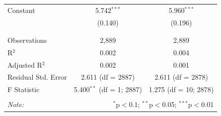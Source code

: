 \documentclass[
  man,floatsintext]{apa7}
\begin{document}
\begin{table}[!htbp]
\begin{tabular}{@{\extracolsep{1pt}}lcc}
 Constant & 5.742$^{***}$ & 5.960$^{***}$ \\ 
  & (0.140) & (0.196) \\ 
  & & \\ 
\hline \\[-1.8ex] 
Observations & 2,889 & 2,889 \\ 
R$^{2}$ & 0.002 & 0.004 \\ 
Adjusted R$^{2}$ & 0.002 & 0.001 \\ 
Residual Std. Error & 2.611 (df = 2887) & 2.611 (df = 2878) \\ 
F Statistic & 5.400$^{**}$ (df = 1; 2887) & 1.275 (df = 10; 2878) \\ 
\hline 
\hline \\[-1.8ex] 
\textit{Note:}  & \multicolumn{2}{r}{$^{*}$p$<$0.1; $^{**}$p$<$0.05; $^{***}$p$<$0.01} \\ 
\end{tabular} 
\end{table}
\end{document}
